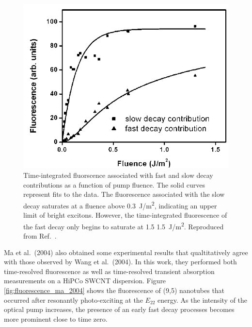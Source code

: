 \begin{figure}[ht]
	\centering
	\includegraphics[scale=0.3]{images/chapter_prior_works/fast_slow_wang_2004}
	\caption{Time-integrated fluorscence associated with fast and slow decay contributions as a function of pump fluence. The solid curves represent fits to the data. The fluorescence associated with the slow decay saturates at a fluence above \SI{0.3}{\joule / \meter \squared}, indicating an upper limit of bright excitons. However, the time-integrated fluorescence of the fast decay only begins to saturate at 1.5  \SI{1.5}{\joule / \meter \squared}. Reproduced from Ref.\ \cite{wang2004observation}.}
	\label{fig:fast_slow_wang_2004}
\end{figure}

Ma et al.\ (2004) also obtained some experimental results that qualtitatively agree with those observed by Wang et al.\ (2004). In this work, they performed both time-resolved fluorescence as well as time-resolved transient absorption measurements on a HiPCo SWCNT dispersion. Figure \ref{fig:fluorescence_ma_2004} shows the fluorescence of (9,5) nanotubes that occurred after resonantly photo-exciting at the $E_{22}$ energy. As the intensity of the optical pump increases, the presence of an early fast decay processes becomes more prominent close to time zero.
%

